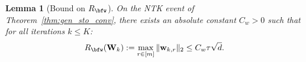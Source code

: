 \documentclass[10pt]{article} %
\newtheorem{lemma}[theorem]{Lemma}
\theoremstyle{definition}
\theoremstyle{plain}
\begin{document}

\begin{lemma}[Bound on $R_{\bfw}$]
\label{lem:Rw_bound}
On the NTK event of Theorem~\ref{thm:gen_sto_conv}, there exists an absolute constant $C_w > 0$ such that for all iterations $k \le K$:
\begin{equation}
    R_{\bfw}(\mathbf{W}_k) := \max_{r \in [m]} \|\mathbf{w}_{k,r}\|_2 \le C_w \tau \sqrt{d}.
\end{equation}
\end{lemma}
\end{document}
